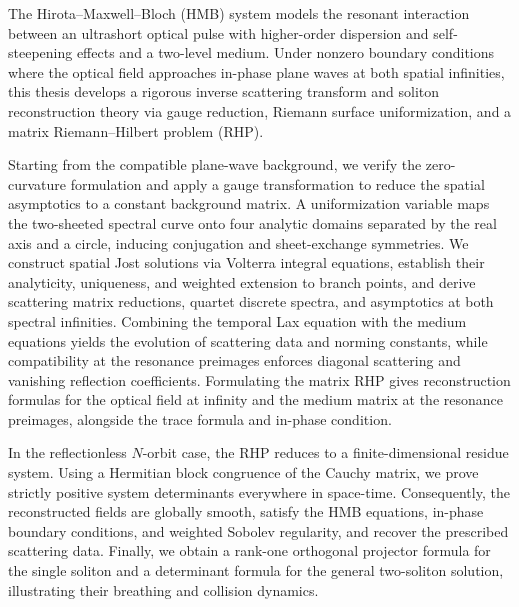 \begin{abstract*}
The Hirota--Maxwell--Bloch (HMB) system models the resonant interaction between an ultrashort optical pulse with higher-order dispersion and self-steepening effects and a two-level medium. Under nonzero boundary conditions where the optical field approaches in-phase plane waves at both spatial infinities, this thesis develops a rigorous inverse scattering transform and soliton reconstruction theory via gauge reduction, Riemann surface uniformization, and a matrix Riemann--Hilbert problem (RHP).

Starting from the compatible plane-wave background, we verify the zero-curvature formulation and apply a gauge transformation to reduce the spatial asymptotics to a constant background matrix. A uniformization variable maps the two-sheeted spectral curve onto four analytic domains separated by the real axis and a circle, inducing conjugation and sheet-exchange symmetries. We construct spatial Jost solutions via Volterra integral equations, establish their analyticity, uniqueness, and weighted extension to branch points, and derive scattering matrix reductions, quartet discrete spectra, and asymptotics at both spectral infinities. Combining the temporal Lax equation with the medium equations yields the evolution of scattering data and norming constants, while compatibility at the resonance preimages enforces diagonal scattering and vanishing reflection coefficients. Formulating the matrix RHP gives reconstruction formulas for the optical field at infinity and the medium matrix at the resonance preimages, alongside the trace formula and in-phase condition.

In the reflectionless $N$-orbit case, the RHP reduces to a finite-dimensional residue system. Using a Hermitian block congruence of the Cauchy matrix, we prove strictly positive system determinants everywhere in space-time. Consequently, the reconstructed fields are globally smooth, satisfy the HMB equations, in-phase boundary conditions, and weighted Sobolev regularity, and recover the prescribed scattering data. Finally, we obtain a rank-one orthogonal projector formula for the single soliton and a determinant formula for the general two-soliton solution, illustrating their breathing and collision dynamics.
\end{abstract*}
